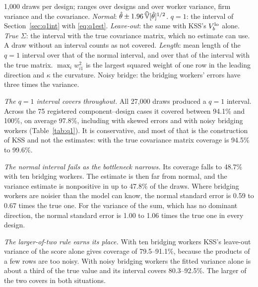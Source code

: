 \begin{table}[htbp]\centering\footnotesize\setlength{\tabcolsep}{4.5pt}
\caption{Coverage of 95\% intervals with a bottleneck of $b$ bridging workers}
\label{tab:q1}

\par\smallskip\begin{minipage}{0.97\linewidth}\footnotesize
1,000 draws per design; ranges over designs and over worker variance, firm variance
and the covariance. \emph{Normal}: $\hat\theta\pm1.96\,\widehat{\mathbb{V}}[\hat\theta]^{1/2}$.
\emph{$q=1$}: the interval of Section~\ref{sec:q1int} with \eqref{eq:q1est}.
\emph{Leave-out}: the same with KSS's $V_b^{\rm lo}$ alone. \emph{True $\Sigma$}: the
interval with the true covariance matrix, which no estimate can use. A draw without an
interval counts as not covered. \emph{Length}: mean length of the $q=1$ interval over
that of the normal interval, and over that of the interval with the true matrix.
$\max_iw_{i1}^2$ is the largest squared weight of one row in the leading direction and
$\kappa$ the curvature. Noisy bridge: the bridging workers' errors have three times
the variance.
\end{minipage}
\end{table}

\emph{The $q=1$ interval covers throughout.} All 27,000 draws produced a $q=1$
interval. Across the 75 registered component--design cases it covered between 94.1\%
and 100\%, on average 97.8\%, including with skewed errors and with noisy bridging
workers (Table~\ref{tab:q1}). It is conservative, and most of that is the construction
of KSS and not the estimates: with the true covariance matrix coverage is 94.5\% to
99.6\%.

\emph{The normal interval fails as the bottleneck narrows.} Its coverage falls to
48.7\% with ten bridging workers. The estimate is then far from normal, and the
variance estimate is nonpositive in up to 47.8\% of the draws. Where bridging workers
are noisier than the model can know, the normal standard error is 0.59 to 0.67 times
the true one. For the variance of the sum, which has no dominant direction, the normal
standard error is 1.00 to 1.06 times the true one in every design.

\emph{The larger-of-two rule earns its place.} With ten bridging workers KSS's
leave-out variance of the score alone gives coverage of 79.5--91.1\%, because the
products of a few rows are too noisy. With noisy bridging workers the fitted variance
alone is about a third of the true value and its interval covers 80.3--92.5\%. The
larger of the two covers in both situations.


